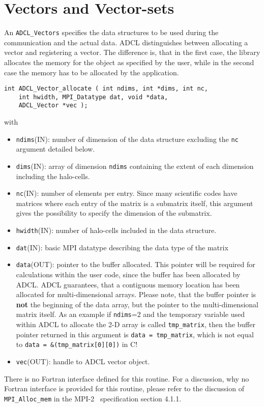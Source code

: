 \section{Vectors and Vector-sets}

An {\tt ADCL\_Vectors} specifies the data structures to be used during the communication and the actual data. ADCL distinguishes between allocating a vector and registering a vector. The difference is, that in the first case, the library allocates the memory for the object as specified by the user, while in the second case the memory has to be allocated by the application. 

\begin{verbatim}
int ADCL_Vector_allocate ( int ndims, int *dims, int nc, 
    int hwidth, MPI_Datatype dat, void *data, 
    ADCL_Vector *vec );
\end{verbatim}
with
\begin{itemize}
\item {\tt ndims}(IN): number of dimension of the data structure excluding the {\tt nc} argument detailed below.
\item {\tt dims}(IN): array of dimension {\tt ndims} containing the extent of each dimension including the halo-cells.
\item {\tt nc}(IN): number of elements per entry. Since many scientific codes have matrices where each entry of the 
	matrix is a submatrix itself, this argument gives the possibility to specify the dimension of the submatrix.
\item {\tt hwidth}(IN): number of halo-cells included in the data structure.
\item {\tt dat}(IN): basic MPI datatype describing the data type of the matrix
\item {\tt data}(OUT): pointer to the buffer allocated. This pointer will be required for calculations within the user code, since the buffer has been allocated by ADCL. ADCL guarantees, that a contiguous memory location has been allocated for multi-dimensional arrays. Please note, that the buffer pointer is {\bf not} the beginning of the data array, but the pointer to the multi-dimensional matrix itself. As an example if {\tt ndims}=2 and the temporary variable used within ADCL to allocate the 2-D array is called {\tt tmp\_matrix}, then the buffer pointer returned in this argument is {\tt data = tmp\_matrix},  which is not equal to {\tt data = \&(tmp\_matrix[0][0])} in C!
\item {\tt vec}(OUT): handle to ADCL vector object.
\end{itemize}
There is no Fortran interface defined for this routine. For a discussion, why no Fortran interface is provided for this routine, please refer to the discussion of {\tt MPI\_Alloc\_mem} in the MPI-2~\cite{mpi2} specification section 4.1.1.

